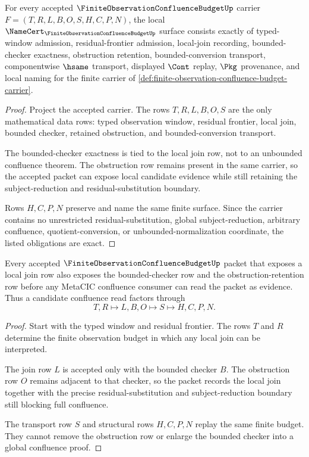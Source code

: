 \begin{theorem}
\label{thm:finite-observation-confluence-budget-namecert-obligations}
For every accepted $\FiniteObservationConfluenceBudgetUp$ carrier $F=(T,R,L,B,O,S,H,C,P,N)$, the local $\NameCert_{\FiniteObservationConfluenceBudgetUp}$ surface consists exactly of typed-window admission, residual-frontier admission, local-join recording, bounded-checker exactness, obstruction retention, bounded-conversion transport, componentwise $\hsame$ transport, displayed $\Cont$ replay, $\Pkg$ provenance, and local naming for the finite carrier of \autoref{def:finite-observation-confluence-budget-carrier}.
\end{theorem}
\begin{proof}
Project the accepted carrier. The rows $T,R,L,B,O,S$ are the only mathematical data rows: typed observation window, residual frontier, local join, bounded checker, retained obstruction, and bounded-conversion transport.

The bounded-checker exactness is tied to the local join row, not to an unbounded confluence theorem. The obstruction row remains present in the same carrier, so the accepted packet can expose local candidate evidence while still retaining the subject-reduction and residual-substitution boundary.

Rows $H,C,P,N$ preserve and name the same finite surface. Since the carrier contains no unrestricted residual-substitution, global subject-reduction, arbitrary confluence, quotient-conversion, or unbounded-normalization coordinate, the listed obligations are exact.
\end{proof}

\begin{theorem}
\label{thm:finite-observation-confluence-budget-obstruction-retention}
Every accepted $\FiniteObservationConfluenceBudgetUp$ packet that exposes a local join row also exposes the bounded-checker row and the obstruction-retention row before any MetaCIC confluence consumer can read the packet as evidence. Thus a candidate confluence read factors through
$$
T,R \longmapsto L,B,O \longmapsto S \longmapsto H,C,P,N .
$$
\end{theorem}
\begin{proof}
Start with the typed window and residual frontier. The rows $T$ and $R$ determine the finite observation budget in which any local join can be interpreted.

The join row $L$ is accepted only with the bounded checker $B$. The obstruction row $O$ remains adjacent to that checker, so the packet records the local join together with the precise residual-substitution and subject-reduction boundary still blocking full confluence.

The transport row $S$ and structural rows $H,C,P,N$ replay the same finite budget. They cannot remove the obstruction row or enlarge the bounded checker into a global confluence proof.
\end{proof}

